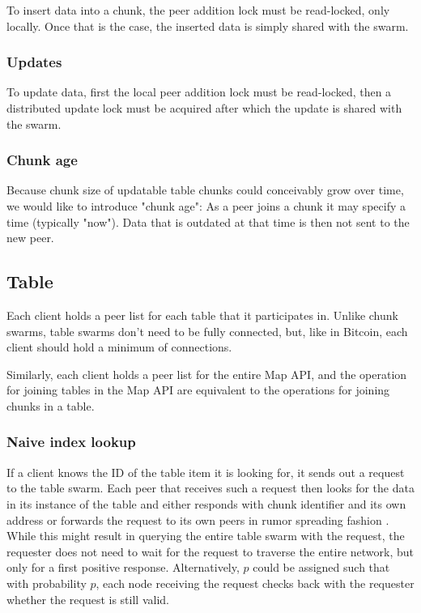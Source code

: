 \documentclass[a4paper, 10pt, conference]{ieeeconf}
\begin{document}
To insert data into a chunk, the peer addition lock must be read-locked, only 
locally. Once that is the case, the inserted data is simply shared with the 
swarm.

\subsubsection{Updates}

To update data, first the local peer addition lock must be read-locked, then a 
distributed update lock must be acquired after which the update is shared with 
the swarm.

\subsubsection{Chunk age}

Because chunk size of updatable table chunks could conceivably grow over time,
we would like to introduce "chunk age": As a peer joins a chunk it may specify
a time (typically "now"). Data that is outdated at that time is then not sent
to the new peer.

\subsection{Table}

Each client holds a peer list for each table that it participates in. Unlike
chunk swarms, table swarms don't need to be fully connected, but, like in
Bitcoin, each client should hold a minimum of connections.

Similarly, each client holds a peer list for the entire Map API, and the
operation for joining tables in the Map API are equivalent to the operations for
joining chunks in a table.

\subsubsection{Naive index lookup}

If a client knows the ID of the table item it is looking for, it sends out a
request to the table swarm. Each peer that receives such a request then looks 
for the data in its instance of the table and either responds with chunk
identifier and its own address or forwards the request to its own peers in
rumor spreading fashion \cite{bitcoin}. While this might result in querying the
entire table swarm with the request, the requester does not need to wait for the
request to traverse the entire network, but only for a first positive response.
Alternatively, $p$ could be assigned such that with probability $p$, each node
receiving the request checks back with the requester whether the request is
still valid.
\end{document}
